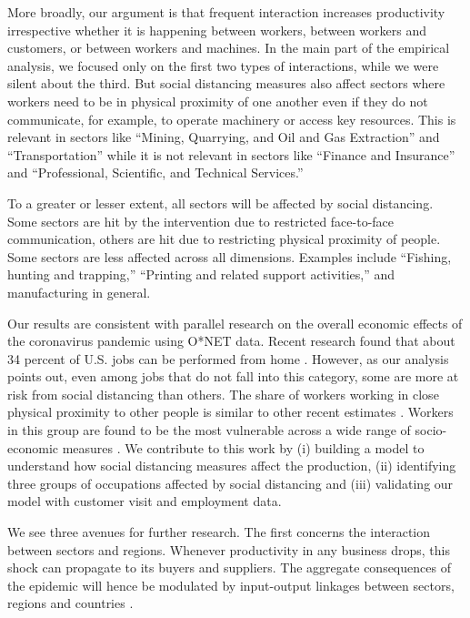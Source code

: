 More broadly, our argument is that frequent interaction increases productivity irrespective whether it is happening between workers, between workers and customers, or between workers and machines. In the main part of the empirical analysis, we focused only on the first two types of interactions, while we were silent about the third. But social distancing measures also affect sectors where workers need to be in physical proximity of one another even if they do not communicate, for example, to operate machinery or access key resources. This is relevant in sectors like ``Mining, Quarrying, and Oil and Gas Extraction'' and ``Transportation'' while it is not relevant in sectors like ``Finance and Insurance'' and ``Professional, Scientific, and Technical Services.'' 

To a greater or lesser extent, all sectors will be affected by social distancing. Some sectors are hit by the intervention due to restricted face-to-face communication, others are hit due to restricting physical proximity of people. Some sectors are less affected across all dimensions. Examples include ``Fishing, hunting and trapping,'' ``Printing and related support activities,'' and manufacturing in general. 

Our results are consistent with parallel research on the overall economic effects of the coronavirus pandemic using O*NET data. Recent research found that about 34 percent of U.S. jobs can be performed from home \cite{Dingel2020-lh}. However, as our analysis points out, even among jobs that do not fall into this category, some are more at risk from social distancing than others. The share of workers working in close physical proximity to other people is similar to other recent estimates \cite{Leibovici2020-qr}. Workers in this group are found to be the most vulnerable across a wide range of socio-economic measures \cite{Jin2020-tq,Mongey2020-qc}. We contribute to this work by (i) building a model to understand how social distancing measures affect the production, (ii) identifying three groups of occupations affected by social distancing and (iii) validating our model with customer visit and employment data.

We see three avenues for further research. The first concerns the interaction between sectors and regions. Whenever productivity in any business drops, this shock can propagate to its buyers and suppliers. The aggregate consequences of the epidemic will hence be modulated by input-output linkages between sectors, regions and countries \cite{Caliendo2014-mr,Caselli2020-nf,Baldwin2020-wb,Barrot2020-jf}.

